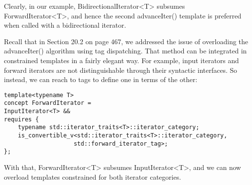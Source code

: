Clearly, in our example, BidirectionalIterator<T> subsumes ForwardIterator<T>, and hence the second advanceIter() template is preferred when called with a bidirectional iterator.





Recall that in Section 20.2 on page 467, we addressed the issue of overloading the advanceIter() algorithm using tag dispatching. That method can be integrated in constrained templates in a fairly elegant way. For example, input iterators and forward iterators are not distinguishable through their syntactic interfaces. So instead, we can reach to tags to define one in terms of the other:

\begin{lstlisting}[style=styleCXX]
template<typename T>
concept ForwardIterator =
InputIterator<T> &&
requires {
	typename std::iterator_traits<T>::iterator_category;
	is_convertible_v<std::iterator_traits<T>::iterator_category,
					std::forward_iterator_tag>;
};
\end{lstlisting}

With that, ForwardIterator<T> subsumes InputIterator<T>, and we can now overload templates constrained for both iterator categories.





















